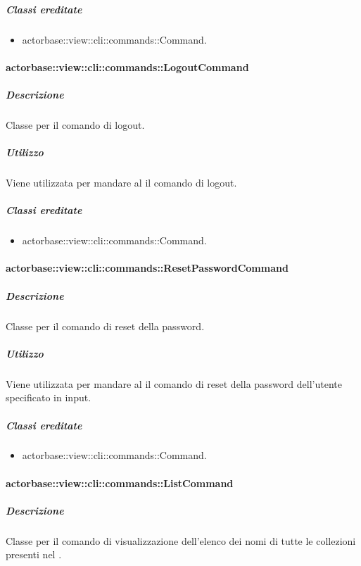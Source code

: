 \documentclass{scalatekids-article}
\begin{document}
\subparagraph{Classi ereditate}

\begin{itemize}
\item actorbase::view::cli::commands::Command.
\end{itemize}

\paragraph{actorbase::view::cli::commands::LogoutCommand}

\subparagraph{Descrizione}

Classe per il comando di logout.

\subparagraph{Utilizzo}

Viene utilizzata per mandare al  il comando di logout.

\subparagraph{Classi ereditate}

\begin{itemize}
\item actorbase::view::cli::commands::Command.
\end{itemize}

\paragraph{actorbase::view::cli::commands::ResetPasswordCommand}

\subparagraph{Descrizione}

Classe per il comando di reset della password.

\subparagraph{Utilizzo}

Viene utilizzata per mandare al  il comando di reset della
password dell'utente specificato in input.

\subparagraph{Classi ereditate}

\begin{itemize}
\item actorbase::view::cli::commands::Command.
\end{itemize}

\paragraph{actorbase::view::cli::commands::ListCommand}

\subparagraph{Descrizione}

Classe per il comando di visualizzazione dell'elenco dei nomi di tutte le
collezioni presenti nel .
\end{document}
